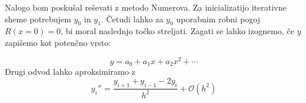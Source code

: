 Nalogo bom poskušal reševati z metodo Numerova. Za inicializatijo iterativne sheme potrebujem $y_0$ in $y_1$. Četudi lahko za $y_0$ uporabnim robni pogoj $R\left(x=0\right) = 0$, bi moral naslednjo točko streljati. Zagati se lahko izognemo, če $y$ zapišemo kot potenčno vrsto:

\begin{equation*}
    y = a_0 + a_1 x + a_2 x^2 + \cdots
\end{equation*}
Drugi odvod lahko aproksimiramo z
\begin{equation*}
    y_i'' = \frac{y_{i+1} + y_{i-1} - 2 y_i}{h^2} + \mathcal{O} (h^2)
\end{equation*}
